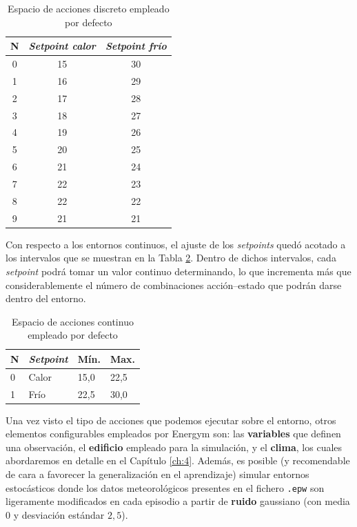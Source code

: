     \begin{table}
        \centering
        \caption{Espacio de acciones discreto empleado por defecto}
        \label{tb:disc-actions}
        \begin{tabular}{ccc}
        N & \textit{Setpoint calor} & \textit{Setpoint frío} \\ \hline
        0 & 15 & 30 \\ \hline
        1 & 16 & 29 \\ \hline
        2 & 17 & 28 \\ \hline
        3 & 18 & 27 \\ \hline
        4 & 19 & 26 \\ \hline
        5 & 20 & 25 \\ \hline
        6 & 21 & 24 \\ \hline
        7 & 22 & 23 \\ \hline
        8 & 22 & 22 \\ \hline
        9 & 21 & 21 \\ \hline
        \end{tabular}
    \end{table}
    
Con respecto a los entornos continuos, el ajuste de los \textit{setpoints} quedó acotado a los intervalos que se muestran en la Tabla \ref{tb:cont-actions}. Dentro de dichos intervalos, cada \textit{setpoint} podrá tomar un valor continuo determinando, lo que incrementa más que considerablemente el número de combinaciones acción--estado que podrán darse dentro del entorno.
    
\begin{table}
    \centering
    \caption{Espacio de acciones continuo empleado por defecto}
    \label{tb:cont-actions}
    \begin{tabular}{llll}
    N & \textit{Setpoint} & Mín. & Max. \\ \hline
    0 & Calor & 15,0 & 22,5 \\ \hline
    1 & Frío & 22,5 & 30,0 \\ \hline
    \end{tabular}
\end{table}

Una vez visto el tipo de acciones que podemos ejecutar sobre el entorno, otros elementos configurables empleados por Energym son: las \textbf{variables} que definen una observación, el \textbf{edificio} empleado para la simulación, y el \textbf{clima}, los cuales abordaremos en detalle en el Capítulo \ref{ch:4}. Además, es posible (y recomendable de cara a favorecer la generalización en el aprendizaje) simular entornos estocásticos donde los datos meteorológicos presentes en el fichero \texttt{.epw} son ligeramente modificados en cada episodio a partir de \textbf{ruido} gaussiano (con media $0$ y desviación estándar $2,5$).

